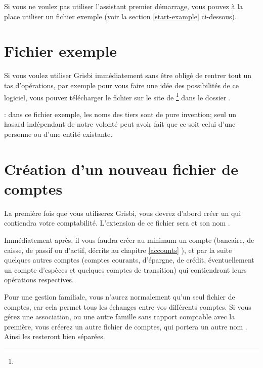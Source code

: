 Si vous ne voulez pas utiliser l'assistant premier démarrage, vous pouvez à la
place utiliser un fichier exemple (voir la section \ref{start-example} ci-dessous).


\section{Fichier exemple\label{start-example}}


Si vous voulez utiliser Grisbi immédiatement sans être obligé de rentrer tout un tas d'opérations, par exemple pour vous faire une idée des possibilités de ce logiciel, vous pouvez télécharger le fichier  sur le site de \footnote{\urlSourceForgeDocumentation{}} dans le dossier .

\Note{}: dans ce fichier exemple, les noms des tiers sont de pure invention; seul un hasard indépendant de notre volonté peut avoir fait que ce soit celui d'une personne ou d'une entité existante.


\section{Création d'un nouveau fichier de comptes\label{start-newfile}}


La première fois que vous utiliserez Grisbi, vous devrez d'abord créer un  qui contiendra votre comptabilité. L'\gls{extension} de ce fichier sera  et son nom . 

Immédiatement après, il vous faudra créer au minimum un compte (bancaire, de caisse, de passif ou d'actif, décrits au chapitre \vref{accounts} ), et par la suite quelques autres comptes (comptes courants, d'épargne, de crédit, éventuellement un compte d'espèces et quelques comptes de transition) qui contiendront leurs opérations respectives. 

Pour une gestion familiale, vous n'aurez normalement qu'un seul fichier de comptes, car cela permet tous les échanges entre vos différents comptes. Si vous gérez une association, ou une autre famille sans rapport comptable avec la première, vous créerez un autre fichier de comptes, qui portera un autre nom . Ainsi les  resteront bien séparées.


